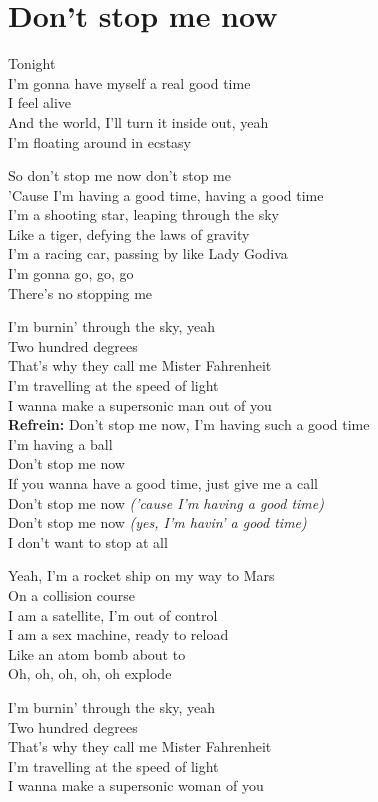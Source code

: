 \section{Don't stop me now}
Tonight\\
I'm gonna have myself a real good time\\
I feel alive\\
And the world, I'll turn it inside out, yeah\\
I'm floating around in ecstasy

So don't stop me now don't stop me\\
'Cause I'm having a good time, having a good time\\

I'm a shooting star, leaping through the sky\\
Like a tiger, defying the laws of gravity\\
I'm a racing car, passing by like Lady Godiva\\
I'm gonna go, go, go\\
There's no stopping me

I'm burnin' through the sky, yeah\\
Two hundred degrees\\
That's why they call me Mister Fahrenheit\\
I'm travelling at the speed of light\\
I wanna make a supersonic man out of you\\

\textbf{Refrein:}
Don't stop me now, I'm having such a good time\\
I'm having a ball\\
Don't stop me now\\
If you wanna have a good time, just give me a call\\
Don't stop me now \textit{('cause I'm having a good time)}\\
Don't stop me now \textit{(yes, I'm havin' a good time)}\\
I don't want to stop at all

Yeah, I'm a rocket ship on my way to Mars\\
On a collision course\\
I am a satellite, I'm out of control\\
I am a sex machine, ready to reload\\
Like an atom bomb about to\\
Oh, oh, oh, oh, oh explode

I'm burnin' through the sky, yeah\\
Two hundred degrees\\
That's why they call me Mister Fahrenheit\\
I'm travelling at the speed of light\\
I wanna make a supersonic woman of you

